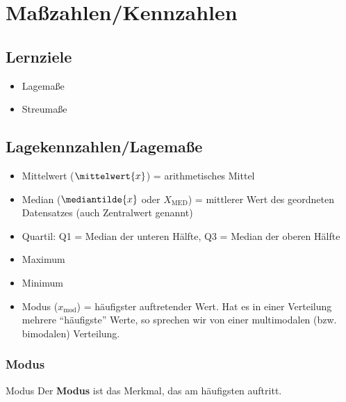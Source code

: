 
\section{Maßzahlen/Kennzahlen}

\subsection*{Lernziele}

\begin{itemize}
\item Lagemaße
\item Streumaße
\end{itemize}
\newpage

\subsection{Lagekennzahlen/Lagemaße}
\begin{itemize}
\item Mittelwert ($\mittelwert{x}$) = arithmetisches Mittel
\item Median ($\mediantilde{x}$ oder $X_{\textrm{MED}}$) = mittlerer Wert des geordneten Datensatzes (auch Zentralwert genannt)
\item Quartil: Q1 = Median der unteren Hälfte, Q3 =
  Median der oberen Hälfte
  
\item Maximum
\item Minimum

\item Modus ($x_{\textrm{mod}}$) = häufigster auftretender Wert. Hat es in einer Verteilung mehrere ``häufigste'' Werte, so sprechen wir von einer multimodalen (bzw. bimodalen) Verteilung.\end{itemize}

\subsubsection{Modus}
\begin{definition}{Modus}{}
  Der \textbf{Modus} ist das Merkmal, das am häufigsten auftritt.
\end{definition}


